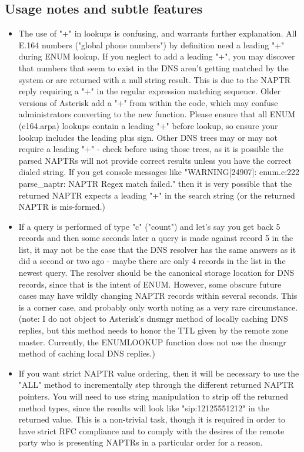 \subsection{Usage notes and subtle features}
\begin{itemize}
  \item The use of "+" in lookups is confusing, and warrants further
  explanation.  All E.164 numbers ("global phone numbers") by
  definition need a leading "+" during ENUM lookup.  If you neglect to
  add a leading "+", you may discover that numbers that seem to exist
  in the DNS aren't getting matched by the system or are returned with
  a null string result.  This is due to the NAPTR reply requiring a
  "+" in the regular expression matching sequence.  Older versions of
  Asterisk add a "+" from within the code, which may confuse
  administrators converting to the new function.  Please ensure that
  all ENUM (e164.arpa) lookups contain a leading "+" before lookup, so
  ensure your lookup includes the leading plus sign.  Other DNS trees
  may or may not require a leading "+" - check before using those
  trees, as it is possible the parsed NAPTRs will not provide correct
  results unless you have the correct dialed string.  If you get
  console messages like "WARNING[24907]: enum.c:222 parse\_naptr: NAPTR
  Regex match failed." then it is very possible that the returned
  NAPTR expects a leading "+" in the search string (or the returned
  NAPTR is mis-formed.)

  \item If a query is performed of type "c" ("count") and let's say you
  get back 5 records and then some seconds later a query is made
  against record 5 in the list, it may not be the case that the DNS
  resolver has the same answers as it did a second or two ago - maybe
  there are only 4 records in the list in the newest query.  The
  resolver should be the canonical storage location for DNS records,
  since that is the intent of ENUM.  However, some obscure future
  cases may have wildly changing NAPTR records within several seconds.
  This is a corner case, and probably only worth noting as a very rare
  circumstance. (note: I do not object to Asterisk's dnsmgr method of
  locally caching DNS replies, but this method needs to honor the TTL
  given by the remote zone master.  Currently, the ENUMLOOKUP function
  does not use the dnsmgr method of caching local DNS replies.)

  \item If you want strict NAPTR value ordering, then it will be
  necessary to use the "ALL" method to incrementally step through the
  different returned NAPTR pointers.  You will need to use string
  manipulation to strip off the returned method types, since the
  results will look like "sip:12125551212" in the returned value.
  This is a non-trivial task, though it is required in order to have
  strict RFC compliance and to comply with the desires of the remote
  party who is presenting NAPTRs in a particular order for a reason.


\end{itemize}
